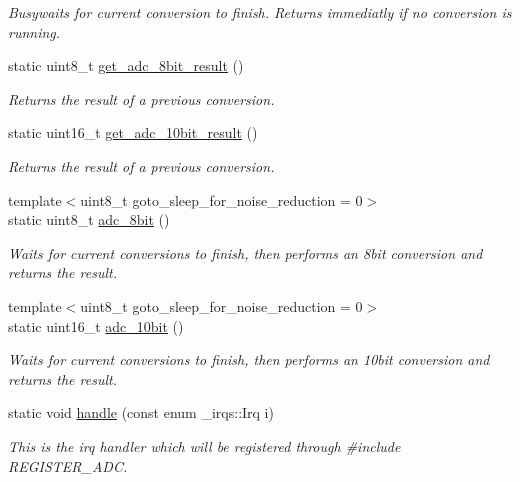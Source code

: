 \begin{DoxyCompactItemize}
\begin{DoxyCompactList}\small\item\em Busywaits for current conversion to finish. Returns immediatly if no conversion is running. \end{DoxyCompactList}\item 
static uint8\+\_\+t \hyperlink{classadc_1_1Adc_a1044fe51b95416b2030454b3869ec195}{get\+\_\+adc\+\_\+8bit\+\_\+result} ()
\begin{DoxyCompactList}\small\item\em Returns the result of a previous conversion. \end{DoxyCompactList}\item 
static uint16\+\_\+t \hyperlink{classadc_1_1Adc_a75998163e7a038560cdc29344208ba15}{get\+\_\+adc\+\_\+10bit\+\_\+result} ()
\begin{DoxyCompactList}\small\item\em Returns the result of a previous conversion. \end{DoxyCompactList}\item 
{\footnotesize template$<$uint8\+\_\+t goto\+\_\+sleep\+\_\+for\+\_\+noise\+\_\+reduction = 0$>$ }\\static uint8\+\_\+t \hyperlink{classadc_1_1Adc_a2b2e98b10cfa98a34ac491150304f58e}{adc\+\_\+8bit} ()
\begin{DoxyCompactList}\small\item\em Waits for current conversions to finish, then performs an 8bit conversion and returns the result. \end{DoxyCompactList}\item 
{\footnotesize template$<$uint8\+\_\+t goto\+\_\+sleep\+\_\+for\+\_\+noise\+\_\+reduction = 0$>$ }\\static uint16\+\_\+t \hyperlink{classadc_1_1Adc_ae90131099182fa17167766def8065138}{adc\+\_\+10bit} ()
\begin{DoxyCompactList}\small\item\em Waits for current conversions to finish, then performs an 10bit conversion and returns the result. \end{DoxyCompactList}\item 
static void \hyperlink{classadc_1_1Adc_a29553e78481cc637a6dbc5e59da0c3ba}{handle} (const enum \+\_\+irqs\+::\+Irq i)
\begin{DoxyCompactList}\small\item\em This is the irq handler which will be registered through {\ttfamily \#include R\+E\+G\+I\+S\+T\+E\+R\+\_\+\+A\+DC}. \end{DoxyCompactList}\end{DoxyCompactItemize}


